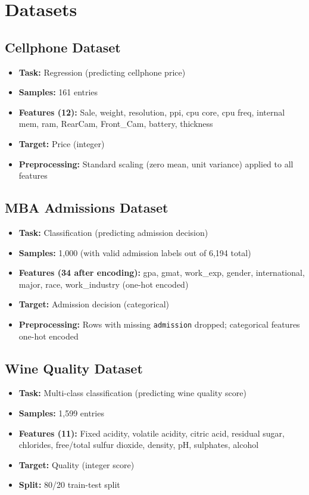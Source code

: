 \documentclass[12pt,a4paper]{article}
\begin{document}
\section{Datasets}

\subsection{Cellphone Dataset}
\begin{itemize}
    \item \textbf{Task:} Regression (predicting cellphone price)
    \item \textbf{Samples:} 161 entries
    \item \textbf{Features (12):} Sale, weight, resolution, ppi, cpu core, cpu freq, internal mem, ram, RearCam, Front\_Cam, battery, thickness
    \item \textbf{Target:} Price (integer)
    \item \textbf{Preprocessing:} Standard scaling (zero mean, unit variance) applied to all features
\end{itemize}

\subsection{MBA Admissions Dataset}
\begin{itemize}
    \item \textbf{Task:} Classification (predicting admission decision)
    \item \textbf{Samples:} 1,000 (with valid admission labels out of 6,194 total)
    \item \textbf{Features (34 after encoding):} gpa, gmat, work\_exp, gender, international, major, race, work\_industry (one-hot encoded)
    \item \textbf{Target:} Admission decision (categorical)
    \item \textbf{Preprocessing:} Rows with missing \texttt{admission} dropped; categorical features one-hot encoded
\end{itemize}

\subsection{Wine Quality Dataset}
\begin{itemize}
    \item \textbf{Task:} Multi-class classification (predicting wine quality score)
    \item \textbf{Samples:} 1,599 entries
    \item \textbf{Features (11):} Fixed acidity, volatile acidity, citric acid, residual sugar, chlorides, free/total sulfur dioxide, density, pH, sulphates, alcohol
    \item \textbf{Target:} Quality (integer score)
    \item \textbf{Split:} 80/20 train-test split
\end{itemize}
\end{document}

